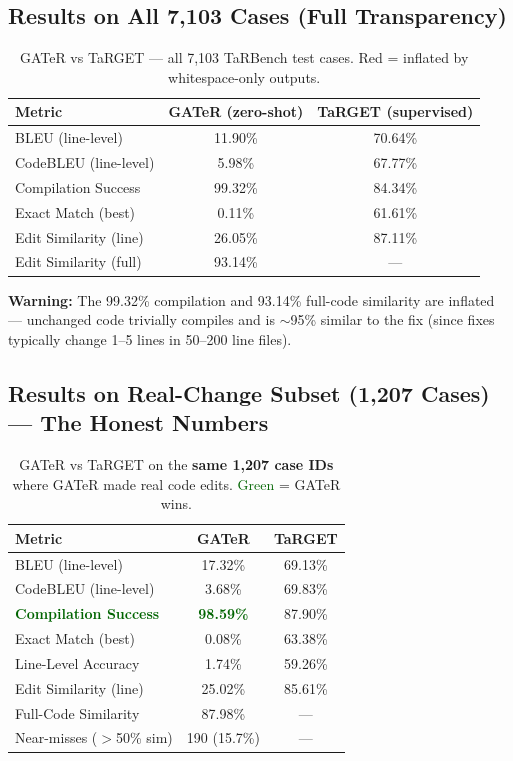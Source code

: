 \documentclass[11pt,a4paper]{article}
\begin{document}
\subsection{Results on All 7,103 Cases (Full Transparency)}

\begin{table}[h!]
\centering\small
\caption{GATeR vs TaRGET --- all 7,103 TaRBench test cases.
{\color{darkred}Red} = inflated by whitespace-only outputs.}
\begin{tabular}{lcc}
\toprule
\textbf{Metric} & \textbf{GATeR (zero-shot)} & \textbf{TaRGET (supervised)} \\
\midrule
BLEU (line-level)      &  11.90\%  &  70.64\% \\
CodeBLEU (line-level)  &   5.98\%  &  67.77\% \\
{\color{darkred}Compilation Success} &
  {\color{darkred}99.32\%} & 84.34\% \\
Exact Match (best)     &   0.11\%  &  61.61\% \\
Edit Similarity (line) &  26.05\%  &  87.11\% \\
{\color{darkred}Edit Similarity (full)} &
  {\color{darkred}93.14\%} &  ---  \\
\bottomrule
\end{tabular}
\end{table}

\textbf{Warning:} The 99.32\% compilation and 93.14\% full-code similarity
are inflated --- unchanged code trivially compiles and is $\sim$95\%
similar to the fix (since fixes typically change 1--5 lines in 50--200
line files).

\subsection{Results on Real-Change Subset (1,207 Cases) --- The Honest Numbers}

\begin{table}[h!]
\centering\small
\caption{GATeR vs TaRGET on the \textbf{same 1,207 case IDs} where GATeR
made real code edits.  \textcolor{darkgreen}{Green} = GATeR wins.}
\begin{tabular}{lcc}
\toprule
\textbf{Metric} & \textbf{GATeR} & \textbf{TaRGET} \\
\midrule
BLEU (line-level)              &  17.32\%  &  69.13\% \\
CodeBLEU (line-level)          &   3.68\%  &  69.83\% \\
\textcolor{darkgreen}{\textbf{Compilation Success}} &
  \textcolor{darkgreen}{\textbf{98.59\%}} & 87.90\% \\
Exact Match (best)             &   0.08\%  &  63.38\% \\
Line-Level Accuracy            &   1.74\%  &  59.26\% \\
Edit Similarity (line)         &  25.02\%  &  85.61\% \\
Full-Code Similarity           &  87.98\%  &   ---    \\
Near-misses ($>$50\% sim)      & 190 (15.7\%) & --- \\
\bottomrule
\end{tabular}
\end{table}
\end{document}
